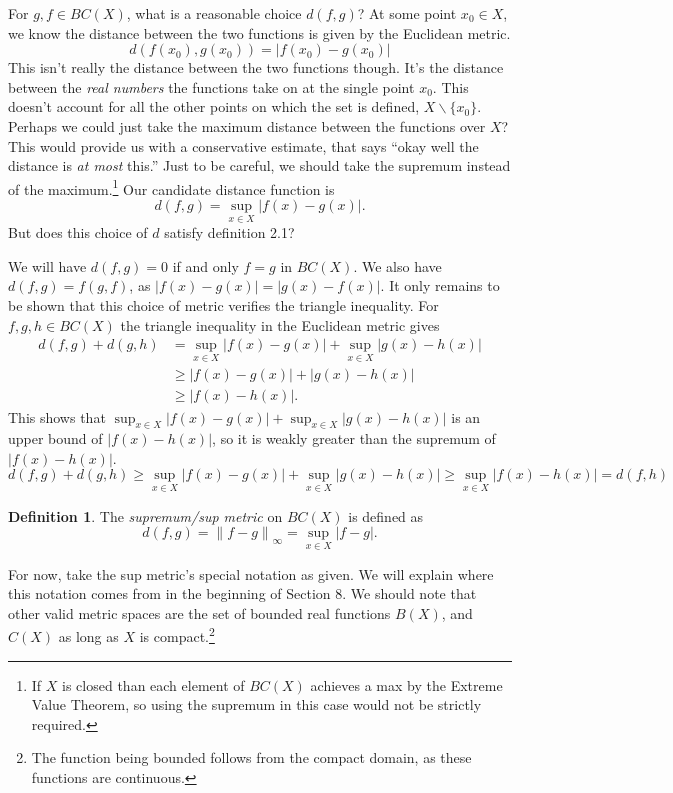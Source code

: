\documentclass{article}
\newcommand{\norm}[1]{\left\lVert#1\right\rVert}
\theoremstyle{definition}
\newtheorem{definition}{Definition}[section]
\begin{document}
	For $ g,f\in BC(X) $, what is a reasonable choice $ d(f,g) $? At some point $ x_0\in X $, we know the distance between the two functions is given by the Euclidean metric. $$d(f(x_0),g(x_0))=|f(x_0)-g(x_0)| $$ This isn't really the distance between the two functions though. It's the distance between the \textit{real numbers} the functions take on at the single point $ x_0 $. This doesn't account for all the other points on which the set is defined, $ X\backslash\{x_0\} $. Perhaps we could just take the maximum distance between the functions over $ X $? This would provide us with a conservative estimate, that says ``okay well the distance is \textit{at most} this.'' Just to be careful, we should take the supremum instead of the maximum.\footnote{If $ X $ is closed than each element of $ BC(X) $ achieves a max by the Extreme Value Theorem, so using the supremum in this case would not be strictly required.} Our candidate distance function is $$d(f,g)=\sup_{x\in X}|f(x)-g(x)| .$$
	But does this choice of $ d $ satisfy definition 2.1?
	
	We will have $ d(f,g)=0 $ if and only $ f=g $ in $ BC(X) $. We also have $ d(f,g)=f(g,f) $, as $ |f(x)-g(x)|=|g(x)-f(x)|  $. It only remains to be shown that this choice of metric verifies the triangle inequality. For $ f,g,h\in BC(X) $ the triangle inequality in the Euclidean metric gives  
	\begin{align*}
		d(f,g)+d(g,h)&=\sup_{x\in X}|f(x)-g(x)|+\sup_{x\in X}|g(x)-h(x)|\\
		&\ge |f(x)-g(x)|+|g(x)-h(x)|\\
		&\ge |f(x)-h(x)|.
	\end{align*}
	This shows that $ \sup_{x\in X}|f(x)-g(x)|+\sup_{x\in X}|g(x)-h(x)| $ is an upper bound of $ |f(x)-h(x)| $, so it is weakly greater than the supremum of $ |f(x)-h(x)| $.
	$$	d(f,g)+d(g,h)\ge \sup_{x\in X}|f(x)-g(x)|+\sup_{x\in X}|g(x)-h(x)|\ge \sup_{x\in X} |f(x)-h(x)|=d(f,h) $$
	\begin{definition}
		The \textit{\color{red}supremum/sup metric} on $ BC(X) $ is defined as $$d(f,g)=\norm{f-g}_\infty=\sup_{x\in X}|f-g|. $$
	\end{definition}
	For now, take the sup metric's special notation as given. We will explain where this notation comes from in the beginning of Section 8. We should note that other valid metric spaces are the set of bounded real functions $ B(X) $, and $ C(X) $ as long as $ X $ is compact.\footnote{The function being bounded follows from the compact domain, as these functions are continuous. }
	
\end{document}
